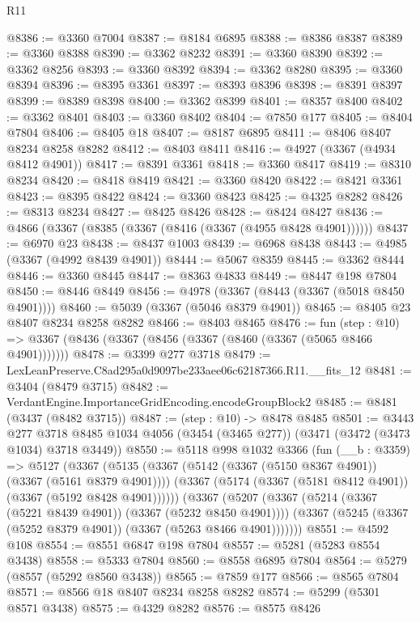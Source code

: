 \begin{lexlean}{R11}
\begin{coremodule}
@8386 := @3360 @7004
@8387 := @8184 @6895
@8388 := @8386 @8387
@8389 := @3360 @8388
@8390 := @3362 @8232
@8391 := @3360 @8390
@8392 := @3362 @8256
@8393 := @3360 @8392
@8394 := @3362 @8280
@8395 := @3360 @8394
@8396 := @8395 @3361
@8397 := @8393 @8396
@8398 := @8391 @8397
@8399 := @8389 @8398
@8400 := @3362 @8399
@8401 := @8357 @8400
@8402 := @3362 @8401
@8403 := @3360 @8402
@8404 := @7850 @177
@8405 := @8404 @7804
@8406 := @8405 @18
@8407 := @8187 @6895
@8411 := @8406 @8407 @8234 @8258 @8282
@8412 := @8403 @8411
@8416 := @4927 (@3367 (@4934 @8412 @4901))
@8417 := @8391 @3361
@8418 := @3360 @8417
@8419 := @8310 @8234
@8420 := @8418 @8419
@8421 := @3360 @8420
@8422 := @8421 @3361
@8423 := @8395 @8422
@8424 := @3360 @8423
@8425 := @4325 @8282
@8426 := @8313 @8234
@8427 := @8425 @8426
@8428 := @8424 @8427
@8436 := @4866 (@3367 (@8385 (@3367 (@8416 (@3367 (@4955 @8428 @4901))))))
@8437 := @6970 @23
@8438 := @8437 @1003
@8439 := @6968 @8438
@8443 := @4985 (@3367 (@4992 @8439 @4901))
@8444 := @5067 @8359
@8445 := @3362 @8444
@8446 := @3360 @8445
@8447 := @8363 @4833
@8449 := @8447 @198 @7804
@8450 := @8446 @8449
@8456 := @4978 (@3367 (@8443 (@3367 (@5018 @8450 @4901))))
@8460 := @5039 (@3367 (@5046 @8379 @4901))
@8465 := @8405 @23 @8407 @8234 @8258 @8282
@8466 := @8403 @8465
@8476 := fun (step : @10) =>
  @3367 (@8436 (@3367 (@8456 (@3367 (@8460 (@3367 (@5065 @8466 @4901)))))))
@8478 := @3399 @277 @3718
@8479 := LexLeanPreserve.C8ad295a0d9097be233aee06c62187366.R11.__fits_12
@8481 := @3404 (@8479 @3715)
@8482 := VerdantEngine.ImportanceGridEncoding.encodeGroupBlock2
@8485 := @8481 (@3437 (@8482 @3715))
@8487 := (step : @10) -> @8478 @8485
@8501 := @3443
    @277
    @3718
    @8485
    @1034
    @4056
    (@3454 (@3465 @277))
    (@3471 (@3472 (@3473 @1034) @3718 @3449))
@8550 := @5118
    @998
    @1032
    @3366
    (fun (__b : @3359) =>
    @5127
      (@3367
        (@5135
          (@3367 (@5142 (@3367 (@5150 @8367 @4901)) (@3367 (@5161 @8379 @4901))))
          (@3367 (@5174 (@3367 (@5181 @8412 @4901)) (@3367 (@5192 @8428 @4901))))))
      (@3367
        (@5207
          (@3367 (@5214 (@3367 (@5221 @8439 @4901)) (@3367 (@5232 @8450 @4901))))
          (@3367 (@5245 (@3367 (@5252 @8379 @4901)) (@3367 (@5263 @8466 @4901)))))))
@8551 := @4592 @108
@8554 := @8551 @6847 @198 @7804
@8557 := @5281 (@5283 @8554 @3438)
@8558 := @5333 @7804
@8560 := @8558 @6895 @7804
@8564 := @5279 (@8557 (@5292 @8560 @3438))
@8565 := @7859 @177
@8566 := @8565 @7804
@8571 := @8566 @18 @8407 @8234 @8258 @8282
@8574 := @5299 (@5301 @8571 @3438)
@8575 := @4329 @8282
@8576 := @8575 @8426

\end{coremodule}
\end{lexlean}
